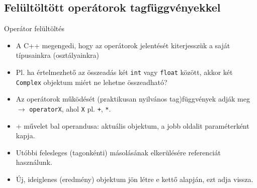 \documentclass[usenames,dvipsnames,aspectratio=169]{beamer}
\begin{document}
\subsection{Felültöltött operátorok tagfüggvényekkel}

\begin{frame}
    Operátor felültöltés
    \begin{itemize}
        \item A C++ megengedi, hogy az operátorok jelentését kiterjesszük a saját típusainkra (osztályainkra)
        \item Pl. ha értelmezhető az összeadás két \texttt{int} vagy \texttt{float} között, akkor két \texttt{Complex} objektum miért ne lehetne összeadható?
        \item Az operátorok működését (praktikusan nyilvános tag)függvények adják meg $\to$ \texttt{operatorX}, ahol \texttt{X} pl. \texttt{+}, \texttt{*}.
    \end{itemize}
\end{frame}

\begin{frame}
    \begin{exampleblock}{}
        \scriptsize
        
    \end{exampleblock}
    \begin{itemize}
        \small
        \item $+$ művelet bal operandusa: aktuális objektum, a jobb oldalit paraméterként kapja.
        \item Utóbbi felesleges (tagonkénti) másolásának elkerülésére referenciát használunk.
        \item Új, ideiglenes (eredmény) objektum jön létre e kettő alapján, ezt adja vissza.
    \end{itemize}
\end{frame}

\begin{frame}
    \begin{exampleblock}{}
        \footnotesize
        
    \end{exampleblock}
\end{frame}
\end{document}
